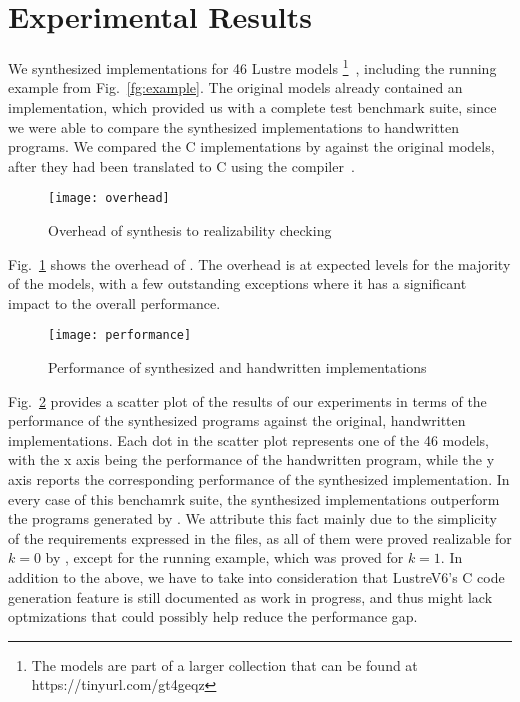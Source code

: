 \section{Experimental Results}
\label{sec:experiment}

We synthesized implementations for 46 Lustre models%
\footnote{The models are part of a larger collection
that can be found at
https://tinyurl.com/gt4geqz}~\cite{Hagen08:FMCAD}, including the running example from Fig.~\ref{fg:example}.
 The original models already contained an implementation,
which provided us with a complete test benchmark suite, since we were able to
compare the synthesized implementations to handwritten programs.
We compared the C implementations by \jkindsynt against the original models, after they had been translated
to C using the \lustrev compiler~\cite{lustrev6}.

\begin{figure}[]
	\centering
	\texttt{[image: overhead]}    	
	\caption{Overhead of synthesis to realizability checking}
	\label{fg:overhead}
\end{figure}

Fig.~\ref{fg:overhead} shows the overhead of \jkindsynt. The overhead is at
expected levels for the majority of the models, with a few outstanding
exceptions where it has a significant impact to the overall performance.

\begin{figure}[H]
	\centering
	\texttt{[image: performance]}    	
	\caption{Performance of synthesized and handwritten implementations}
	\label{fg:performance}
\end{figure}

Fig.~\ref{fg:performance} provides a scatter plot of the results of our
experiments in terms of the performance of the synthesized programs against the original, handwritten
implementations. Each dot in the scatter plot represents one of the 46
models, with the x axis being the performance of the handwritten
program, while the y axis reports the corresponding performance of the
synthesized implementation. In every case of this benchamrk suite, the
synthesized implementations outperform the programs generated by \lustrev.
We attribute this fact mainly due to the simplicity of the requirements expressed in the files,
as all of them were proved realizable for $k=0$ by \jkind, except for the running
example, which was proved for $k=1$.
In addition to the above, we have to take into consideration that LustreV6's C
code generation feature is still documented as work in progress, and thus might
lack optmizations that could possibly help reduce the performance gap.

